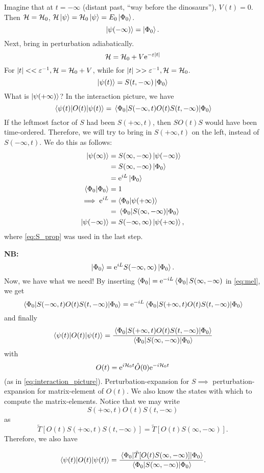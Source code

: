 Imagine that at $t = -\infty$ (distant past, ``way before the dinosaurs''), $V(t) = 0$. Then $\mathcal{H} = \mathcal{H}_0$, $\mathcal{H}\ket{\psi} = \mathcal{H}_0\ket{\psi} = E_0\ket{\Phi_0}$.
\[\ket{\psi(-\infty)} =\ket{\Phi_0}.\]
Next, bring in perturbation adiabatically. \[\mathcal{H} = \mathcal{H}_0 + V\mathrm{e}^{-\varepsilon|t|}\]
For $|t|<<\varepsilon^{-1}, \mathcal{H} = \mathcal{H}_0 +V$, while for $|t|>>\ep^{-1}, \Ha = \Ha_0$.
\begin{equation} 
\ket{\psi(t)} = S(t, -\infty)\ket{\Phi_0}
\end{equation}
What is $\ket{\psi(+\infty)}$? In the interaction picture, we have
\begin{equation}
\label{eq:mel}
\ev{O(t)}{\psi(t)} = \ev{S(-\infty, t)O(t)S(t, -\infty)}{\Phi_0}
\end{equation}
If the leftmost factor of $S$ had been $S(+\infty, t)$, then $SO(t)S$ would have been time-ordered. Therefore, we will try to bring in $S(+\infty, t)$ on the left, instead of $S(-\infty, t)$. We do this as follows:
\begin{align*} 
\ket{\psi(\infty)} &= S(\infty, -\infty)\ket{\psi(-\infty)} \\
&=S(\infty, -\infty)\ket{\Phi_0} \\
&= \e^{iL}\ket{\Phi_0} \\
\braket{\Phi_0}{\Phi_0} &= 1 \\
 \implies \e^{iL} &= \braket{\Phi_0}{\psi(+\infty)}\\
&=\ev{S(\infty, -\infty)}{\Phi_0}\\
\ket{\psi(-\infty)} &= S(-\infty, \infty)\ket{\psi(+\infty)},
\end{align*}
where \cref{eq:S_prop} was used in the last step. 

\textbf{NB:} \[\ket{\Phi_0}= \mathrm{e}^{iL}S(-\infty, \infty)\ket{\Phi_0}.\]
Now, we have what we need! By inserting $\bra{\Phi_0}= \mathrm{e}^{-iL}\bra{\Phi_0}S(\infty, -\infty)$ in \cref{eq:mel}, we get
\begin{equation*} 
\ev{S(-\infty, t)O(t)S(t, -\infty)}{\Phi_0} = \e^{-iL}\ev{S(+\infty, t)O(t)S(t, -\infty)}{\Phi_0}
\end{equation*}
and finally 
\begin{equation}
	\ev{O(t)}{\psi(t)} = \frac{\ev{S(+\infty, t)O(t)S(t, -\infty)}{\Phi_0}}{\ev{S(\infty, -\infty)}{\Phi_0}}
\end{equation}
with \[O(t) = \mathrm{e}^{i\mathcal{H}_0 t}\hat{O}(0)\mathrm{e}^{-i\mathcal{H}_0 t}\] (as in \cref{eq:interaction_picture}).
Perturbation-expansion for $S \implies$ perturbation-expansion for matrix-element of $O(t)$. We also know the states with which to compute the matrix-elements. 
Notice that we may write 
\[
S(+\infty, t)O(t)S(t, -\infty)
\]
as 
\[\tilde{T}[O(t)S(+\infty, t)S(t, -\infty)] = \tilde{T}[O(t)S(\infty, -\infty)].\]
Therefore, we also have 
\begin{tcolorbox}
\begin{equation}
\label{eq:ev_single_op}
\ev{O(t)}{\psi(t)} = \frac{\ev{\tilde{T}[O(t)S(\infty, -\infty)]}{\Phi_0}}{\ev{S(\infty, -\infty)}{\Phi_0}}.
\end{equation}
\end{tcolorbox}

